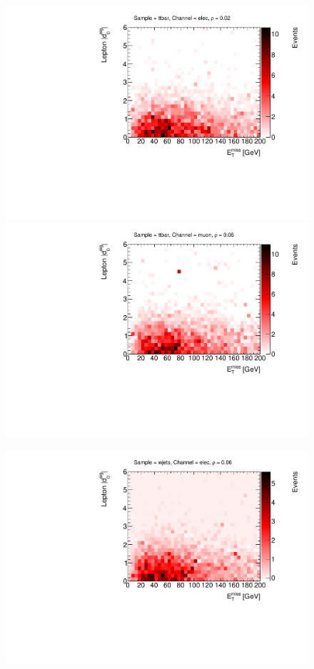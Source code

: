 \begin{figure}[!htbp]
\begin{center}
\includegraphics[scale=0.33]{./figures/boosted/ABCD/h2_d0_met_elec_ttbar}
\includegraphics[scale=0.33]{./figures/boosted/ABCD/h2_d0_met_muon_ttbar}\\
\par\medskip
\includegraphics[scale=0.33]{./figures/boosted/ABCD/h2_d0_met_elec_wjets}

\end{center}
\end{figure}
